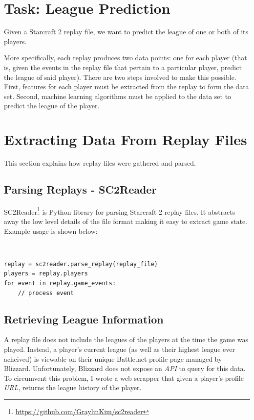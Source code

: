 \documentclass{article} %
\begin{document}
\section{Task: League Prediction}

Given a Starcraft 2 replay file, we want to predict the league of one or both of its players. 

More specifically, each replay produces two data points: one for each player (that is, given the events in the replay file that pertain to a particular player, predict the league of said player). There are two steps involved to make this possible. First, features for each player must be extracted from the replay to form the data set. Second, machine learning algorithms must be applied to the data set to predict the league of the player. 

\section{Extracting Data From Replay Files}

This section explains how replay files were gathered and parsed. 

\subsection{Parsing Replays - SC2Reader}

SC2Reader\footnote{\url{https://github.com/GraylinKim/sc2reader}} is Python library for parsing Starcraft 2 replay files. It abstracts away the low level details of the file format making it easy to extract game state. Example usage is shown below:

\

\lstset{language=Python} 
\begin{lstlisting}
replay = sc2reader.parse_replay(replay_file)
players = replay.players
for event in replay.game_events:
	// process event
\end{lstlisting}

\subsection{Retrieving League Information}

A replay file does not include the leagues of the players at the time the game was played. Instead, a player's current league (as well as their highest league ever acheived) is viewable on their unique Battle.net profile page managed by Blizzard. Unfortunately, Blizzard does not expose an \emph{API} to query for this data. To circumvent this problem, I wrote a web scrapper that given a player's profile \emph{URL}, returns the league history of the player.
\end{document}
